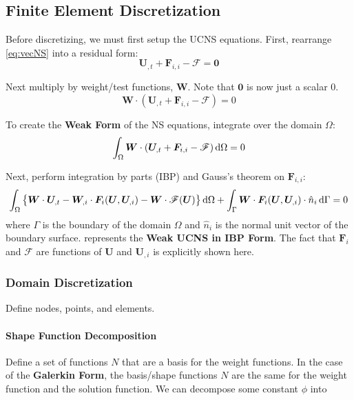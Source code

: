 \documentclass[11pt, letterpaper, twoside]{article}
\renewcommand{\vec}[1]{\bm{#1}}
\newcommand{\U}{\vec{U}}
\newcommand{\F}{\vec{F}}
\newcommand{\W}{\vec{W}}
\newcommand{\src}{\vec{\mathscr{F}}}
\begin{document}
\subsection{Finite Element Discretization}

    Before discretizing, we must first setup the UCNS equations. First, rearrange \cref{eq:vecNS} into a residual form:
    \begin{equation}
        \U_{,t} + \F_{i,i} - \src = \vec{0}
    \end{equation}

    Next multiply by weight/test functions, \(\W\). Note that \(\vec{0}\) is now just a scalar 0.
    \begin{equation}
        \W \cdot ( \U_{,t} + \F_{i,i} - \src )= 0
    \end{equation}

    To create the \textbf{Weak Form} of the NS equations, integrate over the domain \(\Omega\):
    \begin{equation}
        \int_\Omega \W \cdot (\U_{,t} + \F_{i,i} - \src) \dif \Omega= 0
    \end{equation}

    Next, perform integration by parts (IBP) and Gauss's theorem on \(\F_{i,i}\):
    \begin{equation} \label{eq:weakUCNS_IBP}
        \int_\Omega \left\{\W \cdot \U_{,t} - \W_{,i} \cdot \F_i(\U, \U_{,i}) - \W \cdot \src(\U) \right\} \dif \Omega 
        + \int_\Gamma \W \cdot \F_i(\U, \U_{,i}) \cdot \hat n_i \dif\Gamma= 0
    \end{equation}
    where \(\Gamma\) is the boundary of the domain \(\Omega\) and \(\hat n_i\) is the normal unit vector of the boundary surface.  represents the \textbf{Weak UCNS in IBP Form}. The fact that \(\F_i\) and \(\src\) are functions of \(\U\) and \(\U_{,i}\) is explicitly shown here.

    \subsubsection{Domain Discretization}
        Define nodes, points, and elements. 

        \paragraph{Shape Function Decomposition}
        Define a set of functions \(N\) that are a basis for the weight functions. In the case of the \textbf{Galerkin Form}, the basis/shape functions \(N\) are the same for the weight function and the solution function. We can decompose some constant \(\phi\) into
\end{document}
